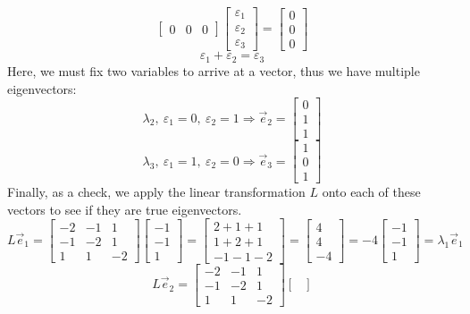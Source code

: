 \documentclass[letterpaper,10pt]{article}
\begin{document}
\begin{description}
\[\begin{bmatrix}
0 & 0 & 0
\end{bmatrix}\begin{bmatrix}
\varepsilon_1\\
\varepsilon_2\\
\varepsilon_3
\end{bmatrix}=\begin{bmatrix}
0\\
0\\
0
\end{bmatrix}\]
\[\varepsilon_1+\varepsilon_2=\varepsilon_3\]
Here, we must fix two variables to arrive at a vector, thus we have multiple eigenvectors:
\[\lambda_2,\ \varepsilon_1=0,\ \varepsilon_2=1 \Rightarrow \vec{e}_2=\begin{bmatrix}
0\\
1\\
1
\end{bmatrix} \]
\[\lambda_3,\ \varepsilon_1=1,\ \varepsilon_2=0 \Rightarrow \vec{e}_3=\begin{bmatrix}
1\\
0\\
1
\end{bmatrix} \]
Finally, as a check, we apply the linear transformation $L$ onto each of these vectors to see if they are true eigenvectors.
\[L\vec{e}_1=\begin{bmatrix}
-2 & -1 & 1\\
-1 & -2 & 1\\
1 & 1 & -2
\end{bmatrix}\begin{bmatrix}
-1\\
-1\\
1
\end{bmatrix}=\begin{bmatrix}
2+1+1\\
1+2+1\\
-1-1-2
\end{bmatrix}=\begin{bmatrix}
4\\
4\\
-4
\end{bmatrix}=-4\begin{bmatrix}
-1\\
-1\\
1
\end{bmatrix}=\lambda_1\vec{e}_1 \]
\[L\vec{e}_2=\begin{bmatrix}
-2 & -1 & 1\\
-1 & -2 & 1\\
1 & 1 & -2
\end{bmatrix}\begin{bmatrix}

\end{bmatrix}\]
\end{description}
\end{document}
